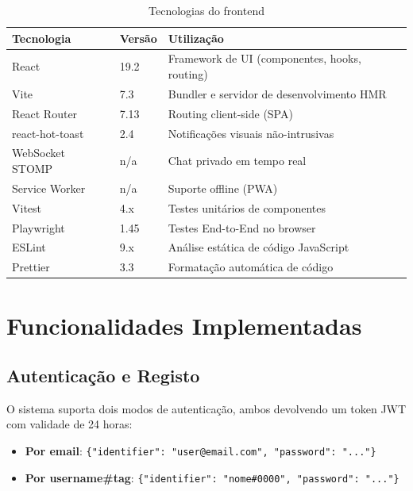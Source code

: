 \documentclass[12pt, a4paper]{report}
\begin{document}
\begin{table}[H]
  \centering
  \begin{tabularx}{\textwidth}{L{4cm} L{2cm} X}
    \toprule
    \textbf{Tecnologia} & \textbf{Versão} & \textbf{Utilização} \\
    \midrule
    React              & 19.2      & Framework de UI (componentes, hooks, routing) \\
    Vite               & 7.3       & Bundler e servidor de desenvolvimento HMR \\
    React Router       & 7.13      & Routing client-side (SPA) \\
    react-hot-toast    & 2.4       & Notificações visuais não-intrusivas \\
    WebSocket STOMP    & n/a       & Chat privado em tempo real \\
    Service Worker     & n/a       & Suporte offline (PWA) \\
    Vitest             & 4.x       & Testes unitários de componentes \\
    Playwright         & 1.45      & Testes End-to-End no browser \\
    ESLint             & 9.x       & Análise estática de código JavaScript \\
    Prettier           & 3.3       & Formatação automática de código \\
    \bottomrule
  \end{tabularx}
  \caption{Tecnologias do frontend}
\end{table}

\chapter{Funcionalidades Implementadas}
\label{chap:funcionalidades}

\section{Autenticação e Registo}

O sistema suporta dois modos de autenticação, ambos devolvendo um token JWT
com validade de 24 horas:

\begin{itemize}
  \item \textbf{Por email}: \texttt{\{"identifier": "user@email.com", "password": "..."\}}
  \item \textbf{Por username\#tag}: \texttt{\{"identifier": "nome\#0000", "password": "..."\}}
\end{itemize}
\end{document}
